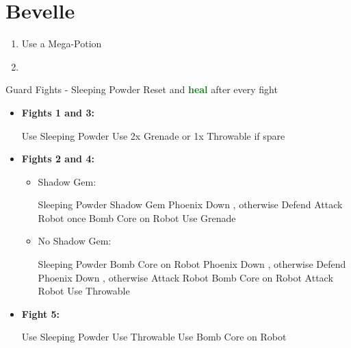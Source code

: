 \chapter{Bevelle}
\begin{enumerate}
	\item Use a Mega-Potion
	\item \formation{\tidus}{\auron}{\kimahri}
\end{enumerate}
\begin{battle}{Guard Fights - Sleeping Powder}
Reset \formation{\tidus}{\auron}{\kimahri} and \textbf{\textcolor{Green}{heal}} after every fight
\vspace{\baselineskip}
	\begin{itemize}
		\item \textbf{Fights 1 and 3:}
			\begin{itemize}
				\switch{\tidus}{\rikku}
				\rikkuf Use Sleeping Powder
				\rikkuf Use 2x Grenade or 1x Throwable if spare
			\end{itemize}
		\item \textbf{Fights 2 and 4:}
			\begin{itemize}
				\item Shadow Gem:
				\begin{itemize}
					\switch{\tidus}{\rikku}
					\rikkuf Sleeping Powder
					\rikkuf Shadow Gem
					\kimahrif Phoenix Down \rikku, otherwise Defend
					\auronf Attack Robot once
					\rikkuf Bomb Core on Robot
					\rikkuf Use Grenade
				\end{itemize}
				\item No Shadow Gem:
				\begin{itemize}
					\switch{\tidus}{\rikku}
					\rikkuf Sleeping Powder
					\rikkuf Bomb Core on Robot
					\kimahrif Phoenix Down \rikku, otherwise Defend
					\auronf Phoenix Down \kimahri, otherwise Attack Robot
					\rikkuf Bomb Core on Robot
					\auronf Attack Robot
					\rikkuf Use Throwable
				\end{itemize}
			\end{itemize}
		\item \textbf{Fight 5:}
			\begin{itemize}
				\switch{\tidus}{\rikku}
				\rikkuf Use Sleeping Powder
				\rikkuf Use Throwable
				\rikkuf Use Bomb Core on Robot
			\end{itemize}
	\end{itemize}
\end{battle}
